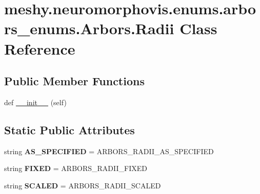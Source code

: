\hypertarget{classmeshy_1_1neuromorphovis_1_1enums_1_1arbors__enums_1_1Arbors_1_1Radii}{}\section{meshy.\+neuromorphovis.\+enums.\+arbors\+\_\+enums.\+Arbors.\+Radii Class Reference}
\label{classmeshy_1_1neuromorphovis_1_1enums_1_1arbors__enums_1_1Arbors_1_1Radii}


 


\subsection*{Public Member Functions}
\begin{DoxyCompactItemize}
\item 
def \hyperlink{classmeshy_1_1neuromorphovis_1_1enums_1_1arbors__enums_1_1Arbors_1_1Radii_af67bffb3b7a3a74dad3833d1b587427f}{\+\_\+\+\_\+init\+\_\+\+\_\+} (self)\hypertarget{classmeshy_1_1neuromorphovis_1_1enums_1_1arbors__enums_1_1Arbors_1_1Radii_af67bffb3b7a3a74dad3833d1b587427f}{}\label{classmeshy_1_1neuromorphovis_1_1enums_1_1arbors__enums_1_1Arbors_1_1Radii_af67bffb3b7a3a74dad3833d1b587427f}

\end{DoxyCompactItemize}
\subsection*{Static Public Attributes}
\begin{DoxyCompactItemize}
\item 
string {\bfseries A\+S\+\_\+\+S\+P\+E\+C\+I\+F\+I\+ED} = \textquotesingle{}A\+R\+B\+O\+R\+S\+\_\+\+R\+A\+D\+I\+I\+\_\+\+A\+S\+\_\+\+S\+P\+E\+C\+I\+F\+I\+ED\textquotesingle{}\hypertarget{classmeshy_1_1neuromorphovis_1_1enums_1_1arbors__enums_1_1Arbors_1_1Radii_ae8095db7ce363ca99d351ce59349c978}{}\label{classmeshy_1_1neuromorphovis_1_1enums_1_1arbors__enums_1_1Arbors_1_1Radii_ae8095db7ce363ca99d351ce59349c978}

\item 
string {\bfseries F\+I\+X\+ED} = \textquotesingle{}A\+R\+B\+O\+R\+S\+\_\+\+R\+A\+D\+I\+I\+\_\+\+F\+I\+X\+ED\textquotesingle{}\hypertarget{classmeshy_1_1neuromorphovis_1_1enums_1_1arbors__enums_1_1Arbors_1_1Radii_a667562c3a6e0b92c7920d17bec2d3b2c}{}\label{classmeshy_1_1neuromorphovis_1_1enums_1_1arbors__enums_1_1Arbors_1_1Radii_a667562c3a6e0b92c7920d17bec2d3b2c}

\item 
string {\bfseries S\+C\+A\+L\+ED} = \textquotesingle{}A\+R\+B\+O\+R\+S\+\_\+\+R\+A\+D\+I\+I\+\_\+\+S\+C\+A\+L\+ED\textquotesingle{}\hypertarget{classmeshy_1_1neuromorphovis_1_1enums_1_1arbors__enums_1_1Arbors_1_1Radii_add80f1d6c695929b32976f123ddc1e01}{}\label{classmeshy_1_1neuromorphovis_1_1enums_1_1arbors__enums_1_1Arbors_1_1Radii_add80f1d6c695929b32976f123ddc1e01}

\end{DoxyCompactItemize}


